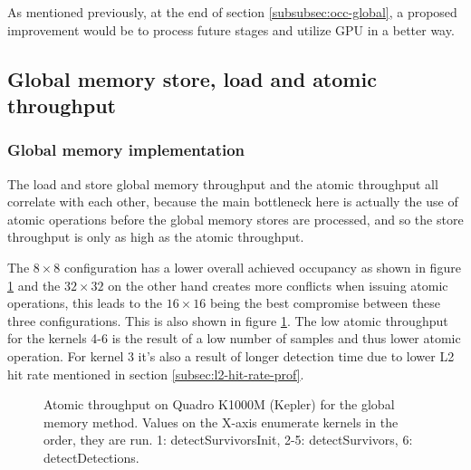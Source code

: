 As mentioned previously, at the end of section \ref{subsubsec:occ-global}, a proposed improvement would be to process future stages and utilize GPU in a better way.

\subsection{Global memory store, load and atomic throughput}\label{subsec:prof-throughput}

\subsubsection{Global memory implementation}\label{subsubsec:prof-thr-global-memory}

The load and store global memory throughput and the atomic throughput all correlate with each other, because the main bottleneck here is actually the use of atomic operations before the global memory stores are processed, and so the store throughput is only as high as the atomic throughput.

The $8 \times 8$ configuration has a lower overall achieved occupancy as shown in figure \ref{fig:occupancy-quadro} and the $32 \times 32$ on the other hand creates more conflicts when issuing atomic operations, this leads to the $16 \times 16$ being the best compromise between these three configurations. This is also shown in figure \ref{fig:occupancy-quadro}. The low atomic throughput for the kernels 4-6 is the result of a low number of samples and thus lower atomic operation. For kernel 3 it's also a result of longer detection time due to lower L2 hit rate mentioned in section \ref{subsec:l2-hit-rate-prof}.

\begin{figure}[ht]
\centering{}
	\caption{Atomic throughput on Quadro K1000M (Kepler) for the global memory method. Values on the X-axis enumerate kernels in the order, they are run. 1: detectSurvivorsInit, 2-5: detectSurvivors, 6: detectDetections.}
	\label{fig:occupancy-quadro}
\end{figure}

